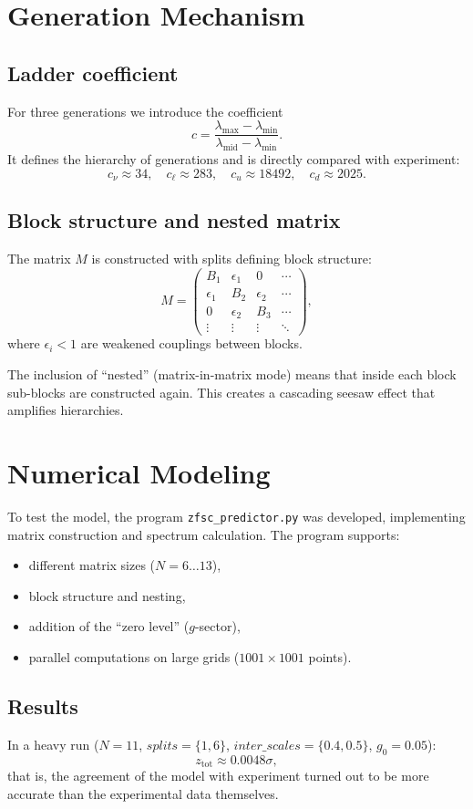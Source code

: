 \documentclass[12pt,a4paper]{article}
\begin{document}
\section{Generation Mechanism}
\subsection{Ladder coefficient}
For three generations we introduce the coefficient
\[
c = \frac{\lambda_{\max} - \lambda_{\min}}{\lambda_{\text{mid}} - \lambda_{\min}}.
\]
It defines the hierarchy of generations and is directly compared with experiment:
\[
c_\nu \approx 34, \quad c_\ell \approx 283, \quad c_u \approx 18492, \quad c_d \approx 2025.
\]

\subsection{Block structure and nested matrix}
The matrix $M$ is constructed with splits defining block structure:
\[
M = \begin{pmatrix}
B_1 & \epsilon_1 & 0 & \cdots \\
\epsilon_1 & B_2 & \epsilon_2 & \cdots \\
0 & \epsilon_2 & B_3 & \cdots \\
\vdots & \vdots & \vdots & \ddots
\end{pmatrix},
\]
where $\epsilon_i < 1$ are weakened couplings between blocks.

The inclusion of ``nested'' (matrix-in-matrix mode) means that inside each block sub-blocks are constructed again. This creates a cascading seesaw effect that amplifies hierarchies.

\section{Numerical Modeling}
To test the model, the program \texttt{zfsc\_predictor.py} was developed, implementing matrix construction and spectrum calculation. The program supports:
\begin{itemize}
  \item different matrix sizes ($N=6 \ldots 13$),
  \item block structure and nesting,
  \item addition of the ``zero level'' ($g$-sector),
  \item parallel computations on large grids ($1001\times1001$ points).
\end{itemize}

\subsection{Results}
In a heavy run ($N=11$, $splits=\{1,6\}$, $inter\_scales=\{0.4,0.5\}$, $g_0=0.05$):
\[
z_{\text{tot}} \approx 0.0048\sigma,
\]
that is, the agreement of the model with experiment turned out to be more accurate than the experimental data themselves.
\end{document}
